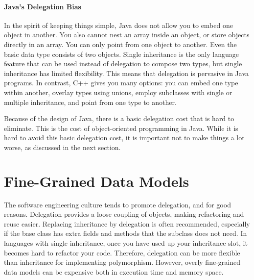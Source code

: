 \paragraph{Java's Delegation Bias} In the spirit of keeping things simple,
Java does not allow you to embed one object in another. 
You also cannot nest an array inside an object, or store objects directly in an
array. You can only point from one object to another. Even the basic
data type  consists of two objects. Single inheritance is the only language feature
that can be used instead of delegation to compose two types, but single
inheritance has limited flexibility. This means that delegation is pervasive
in Java programs. In contrast, C++ gives you many options: 
you can embed one type within another, overlay types using unions, 
employ subclasses with single or multiple inheritance, and point from
one type to another.



Because of the design of Java, there is a basic delegation cost that is hard to eliminate.
This is the cost of object-oriented programming in Java. While it is hard to avoid this basic
delegation cost, it is important not to make things a lot worse, as discussed in the next section. 

\section{Fine-Grained Data Models}
\label{fine-grained-data-models}

The software engineering culture tends to promote delegation, and for good reasons. 
Delegation provides a loose coupling of objects, making refactoring and reuse easier. 
Replacing inheritance by delegation is often recommended, especially if the base class
has extra fields and methods that the subclass does not need. In languages with single inheritance,
once you have used up your inheritance slot, it becomes hard to refactor your code. Therefore,
delegation can be more flexible than inheritance for implementing polymorphism. However, overly fine-grained
data models can be expensive both in execution time and memory space. 

